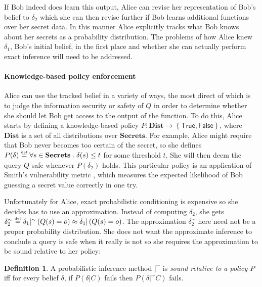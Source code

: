 \documentclass{article} %
\newcommand{\ra}{\rightarrow}
\newcommand{\secrets}[0]{\textbf{Secrets}}
\newcommand{\dists}[0]{\textbf{Dist}}
\newcommand{\sconst}[1]{\ensuremath{\mathsf{#1}}}
\newcommand{\strue}{\sconst{True}}
\newcommand{\sfalse}{\sconst{False}}
\newcommand{\paren}[1]{\left( #1 \right)}
\newcommand{\set}[1]{\left\{ #1 \right\}}
\newcommand{\acond}[0]{|^\sim}
\newcommand{\qsep}[0]{\; . \;}
\newcommand{\stacklabel}[1]{\stackrel{\smash{\scriptscriptstyle \mathrm{#1}}}}
\newcommand{\defeq}{\stacklabel{def}=}
\theoremstyle{plain} %
\theoremstyle{definition} %
\newtheorem*{definition-un}{Definition}
\begin{document}
If Bob indeed does learn this output, Alice can revise her
representation of Bob's belief to $ \delta_2 $ which she can then
revise further if Bob learns additional functions over her secret
data. In this manner Alice explicitly tracks what Bob knows about her
secrets as a probability distribution. The problems of how Alice knew $
\delta_1 $, Bob's initial belief, in the first place and whether she
can actually perform exact inference will need to be addressed.

\paragraph{Knowledge-based policy enforcement}
Alice can use the tracked belief in a variety of ways, the most direct
of which is to judge the information security or safety of $ Q $ in
order to determine whether she should let Bob get access to the output
of the function. To do this, Alice starts by defining a
knowledge-based policy $ P : \dists \ra \set{\strue,\sfalse} $, where
$ \dists $ is a set of all distributions over $ \secrets $. For
example, Alice might require that Bob never becomes too certain of the
secret, so she defines $ P(\delta) \defeq \forall s \in \secrets \qsep
\delta(s) \leq t $ for some threshold $ t $. She will then deem the
query $ Q $ safe whenever $ P(\delta_2) $ holds. This particular
policy is an application of Smith's vulnerability
metric \cite{smith09foundations}, which measures the expected
likelihood of Bob guessing a secret value correctly in one try.

Unfortunately for Alice, exact probabilistic conditioning is expensive
so she decides has to use an approximation. Instead of computing $
\delta_2 $, she gets $ \delta_2^\sim \defeq \delta_1 \acond
\paren{Q(s) = o} \approx \delta_1 | \paren{Q(s) = o} $. The
approximation $ \delta_2^\sim $ here need not be a proper probability
distribution. She does not want the approximate inference to conclude
a query is safe when it really is not so she requires the
approximation to be sound relative to her policy:

\begin{definition-un} A probabilistic inference method $ |^\sim $ is
  \emph{sound relative to a policy $ P $} iff for every belief $
  \delta $, if $ P(\delta | C) $ fails then $ P(\delta |^\sim C) $
  fails.
\end{definition-un}
\end{document}
